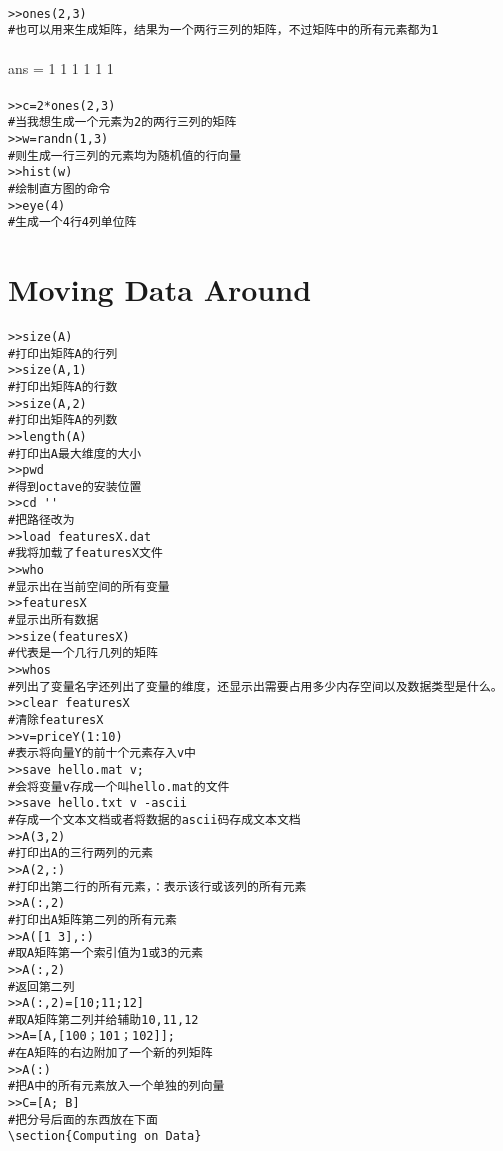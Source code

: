 \documentclass{article}
\begin{document}
\begin{CJK}{UTF8}{gbsn}
\paragraph{}
\begin{verbatim}
>>ones(2,3)
#也可以用来生成矩阵，结果为一个两行三列的矩阵，不过矩阵中的所有元素都为1
\end{verbatim}
\paragraph{}
ans =
    1 1 1
    1 1 1
\paragraph{}
\begin{verbatim}
>>c=2*ones(2,3)
#当我想生成一个元素为2的两行三列的矩阵
>>w=randn(1,3)
#则生成一行三列的元素均为随机值的行向量
>>hist(w)
#绘制直方图的命令
>>eye(4)
#生成一个4行4列单位阵
\end{verbatim}
\section{Moving Data Around}
\paragraph{}
\begin{verbatim}
>>size(A)
#打印出矩阵A的行列
>>size(A,1)
#打印出矩阵A的行数
>>size(A,2)
#打印出矩阵A的列数
>>length(A)
#打印出A最大维度的大小
>>pwd
#得到octave的安装位置
>>cd ''
#把路径改为
>>load featuresX.dat
#我将加载了featuresX文件
>>who
#显示出在当前空间的所有变量
>>featuresX
#显示出所有数据
>>size(featuresX)
#代表是一个几行几列的矩阵
>>whos
#列出了变量名字还列出了变量的维度，还显示出需要占用多少内存空间以及数据类型是什么。
>>clear featuresX
#清除featuresX
>>v=priceY(1:10)
#表示将向量Y的前十个元素存入v中
>>save hello.mat v;
#会将变量v存成一个叫hello.mat的文件
>>save hello.txt v -ascii
#存成一个文本文档或者将数据的ascii码存成文本文档
>>A(3,2)
#打印出A的三行两列的元素
>>A(2,:)
#打印出第二行的所有元素，：表示该行或该列的所有元素
>>A(:,2)
#打印出A矩阵第二列的所有元素
>>A([1 3],:)
#取A矩阵第一个索引值为1或3的元素
>>A(:,2)
#返回第二列
>>A(:,2)=[10;11;12]
#取A矩阵第二列并给辅助10,11,12
>>A=[A,[100；101；102]];
#在A矩阵的右边附加了一个新的列矩阵
>>A(:)
#把A中的所有元素放入一个单独的列向量
>>C=[A; B]
#把分号后面的东西放在下面
\section{Computing on Data}

\end{verbatim}
\end{CJK}
\end{document}
